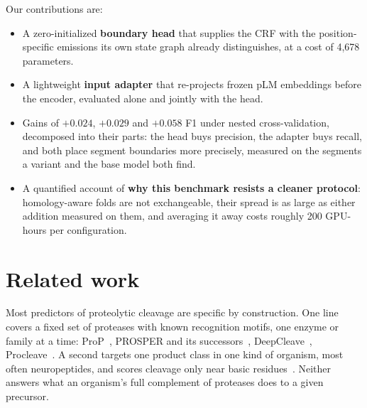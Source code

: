 \documentclass{article}
\begin{document}

Our contributions are:
\begin{itemize}\setlength{\itemsep}{1pt}\setlength{\parskip}{0pt}
  \item A zero-initialized \textbf{boundary head} that supplies the CRF with the position-specific emissions its own state graph already distinguishes, at a cost of 4{,}678 parameters.
  \item A lightweight \textbf{input adapter} that re-projects frozen pLM embeddings before the encoder, evaluated alone and jointly with the head.
  \item Gains of $+0.024$, $+0.029$ and $+0.058$ F1 under nested cross-validation, decomposed into their parts: the head buys precision, the adapter buys recall, and both place segment boundaries more precisely, measured on the segments a variant and the base model both find.
  \item A quantified account of \textbf{why this benchmark resists a cleaner protocol}: homology-aware folds are not exchangeable, their spread is as large as either addition measured on them, and averaging it away costs roughly 200 GPU-hours per configuration.
\end{itemize}


\section{Related work}
\label{sec:related}

Most predictors of proteolytic cleavage are specific by construction. One line covers a fixed set of proteases with known recognition motifs, one enzyme or family at a time: ProP~\citep{duckert2004prop}, PROSPER and its successors~\citep{song2012prosper,li2023prosperousplus}, DeepCleave~\citep{li2020deepcleave}, Procleave~\citep{li2020procleave}. A second targets one product class in one kind of organism, most often neuropeptides, and scores cleavage only near basic residues~\citep{southey2006neuropred,wang2024deepneuropepred}. Neither answers what an organism's full complement of proteases does to a given precursor.
\end{document}

